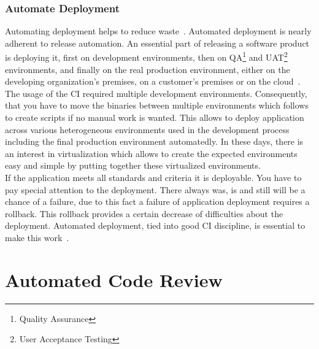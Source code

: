 \subsection{Automate Deployment}

Automating deployment helps to reduce waste~\cite{CollabNet}. Automated deployment is nearly adherent to release automation. An essential part of releasing a software product is deploying it, first on development environments, then on QA\footnote{Quality Assurance} and UAT\footnote{User Acceptance Testing} environments, and finally on the real production environment, either on the developing organization's premises, on a customer's premises or on the cloud~\cite{deployment_automation}. The usage of the CI required multiple development environments. Consequently, that you have to move the binaries between multiple environments which follows to create scripts if no manual work is wanted. This allows to deploy application across various heterogeneous environments used in the development process including the final production environment automatedly. In these days, there is an interest in virtualization which allows to create the expected environments easy and simple by putting together these virtualized environments.\\

If the application meets all standards and criteria it is deployable. You have to pay special attention to the deployment. There always was, is and still will be a chance of a failure, due to this fact a failure of application deployment requires a rollback. This rollback provides a certain decrease of difficulties about the deployment. Automated deployment, tied into good CI discipline, is essential to make this work~\cite{MartinFowler}.

\chapter{Automated Code Review}

